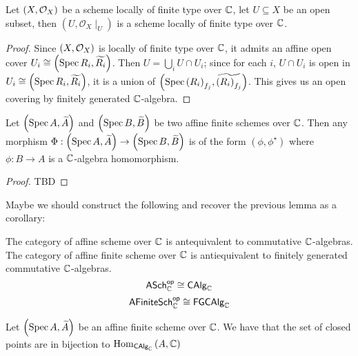 \begin{proposition}
  Let $\left(X, \mathcal{O}_{X}\right)$ be a scheme locally of finite type over $\mathbb{C}$, let $U \subseteq X$ be an open subset, then $(U, \mathcal{O}_{X}\mid_{U})$ is a scheme locally of finite type over $\mathbb{C}$.
\end{proposition}
\begin{proof}
  Since $\left(X, \mathcal{O}_{X}\right)$ is locally of finite type over $\mathbb{C}$, it admits an affine open cover $U_{i}\cong\left(\operatorname*{Spec}{R_{i}}, \widetilde{R_{i}}\right)$.
  Then $U = \bigcup_{i} U \cap U_{i}$; since for each $i$, $U \cap U_{i}$ is open in $U_{i} \cong \left(\operatorname*{Spec}{R_{i}}, \widetilde{R_{i}}\right)$, it is a union of $\left(\operatorname*{Spec}{{\left(R_{i}\right)}_{f_{j}}}, \widetilde{{\left(R_{i}\right)}_{f_{j}}}\right)$. This gives us an open covering by finitely generated $\mathbb{C}$-algebra.

\end{proof}

\begin{proposition}
  Let $\left(\operatorname*{Spec}{A}, \widetilde{A}\right)$ and $\left(\operatorname*{Spec}{B}, \widetilde{B}\right)$ be two affine finite schemes over $\mathbb{C}$. Then any morphism $\Phi : \left(\operatorname*{Spec}{A}, \widetilde{A}\right) \to \left(\operatorname*{Spec}{B}, \widetilde{B}\right)$ is of the form $(\phi, \phi^{\star})$ where $\phi : B \to A$ is a $\mathbb{C}$-algebra homomorphism.
\end{proposition}

\begin{proof}
  TBD
\end{proof}

Maybe we should construct the following and recover the previous lemma as a corollary:
\begin{proposition}
  The category of affine scheme over $\mathbb{C}$ is antequivalent to commutative $\mathbb{C}$-algebras.
  The category of affine finite scheme over $\mathbb{C}$ is antiequivalent to finitely generated commutative $\mathbb{C}$-algebras.
  \[
    \mathsf{ASch}_{\mathbb{C}}^{\mathsf{op}}\cong \mathsf{CAlg}_{\mathbb{C}}
  \]
  \[
    \mathsf{AFiniteSch}_{\mathbb{C}}^{\mathsf{op}}\cong \mathsf{FGCAlg}_{\mathbb{C}}
  \]
\end{proposition}

\begin{proposition}
  Let $\left(\operatorname*{Spec}{A}, \widetilde{A}\right)$ be an affine finite scheme over $\mathbb{C}$. We have that the set of closed points are in bijection to
  $\operatorname{Hom}_{\mathsf{CAlg}_{\mathbb{C}}}\left(A, \mathbb{C}\right)$
\end{proposition}

